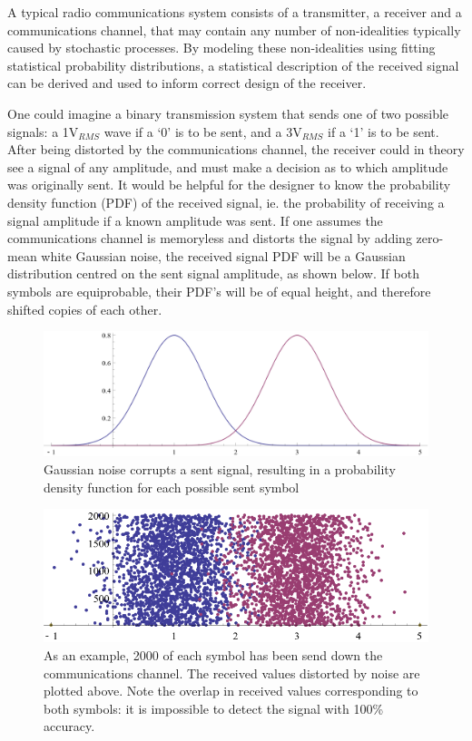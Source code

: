 A typical radio communications system consists of a transmitter, a
receiver and a communications channel, that may contain any number of
non-idealities typically caused by stochastic processes. By modeling these non-idealities using fitting statistical probability distributions, a statistical description of the received signal can be derived and used to inform correct design of the receiver.

One could imagine a binary transmission system that sends one of two
possible signals: a 1V$_{RMS}$ wave if a `0' is to be sent, and a
3V$_{RMS}$ if a `1' is to be sent. After being distorted by the
communications channel, the receiver could in theory see a signal of any
amplitude, and must make a decision as to which amplitude was originally
sent. It would be helpful for the designer to know the probability density function (PDF)
of the received signal, ie. the probability of receiving a signal
amplitude if a known amplitude was sent. If one assumes the communications
channel is memoryless and distorts the signal by adding zero-mean white Gaussian noise,
the received signal PDF will be a Gaussian distribution centred on the
sent signal amplitude, as shown below. If both symbols are equiprobable, their PDF's will be of equal height, and therefore shifted copies of each other.

\begin{figure}[htbp]
\centering
\includegraphics[width=\linewidth]{4-PAM_PDF.png}
\caption[Ideal received signal PDF]{Gaussian noise corrupts a sent signal, resulting in a
probability density function for each possible sent symbol}
\end{figure}

\begin{figure}[htbp]
\centering
\includegraphics[width=\linewidth]{4-PAM_samples.png}
\caption[AWGN channel simulation]{As an example, 2000 of each symbol has been send down the communications channel. The received values distorted by noise are
plotted above. Note the overlap in received values corresponding to both
symbols: it is impossible to detect the signal with 100\% accuracy.}
\end{figure}

